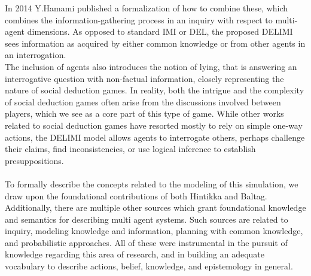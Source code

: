 In 2014 Y.Hamami\cite{delimi} published a formalization of how to combine
these, which combines the information-gathering process in an inquiry with
respect to multi-agent dimensions. As opposed to standard IMI or DEL, the
proposed DELIMI sees information as acquired by either common knowledge or from
other agents in an interrogation. \\ The inclusion of agents also introduces
the notion of lying, that is answering an interrogative question with
non-factual information, closely representing the nature of social deduction
games. In reality, both the intrigue and the complexity of social deduction
games often arise from the discussions involved between players, which we see
as a core part of this type of game. While other works related to social
deduction games have resorted mostly to rely on simple one-way actions, the
DELIMI model allows agents to interrogate others, perhaps challenge their
claims, find inconsistencies, or use logical inference to establish
presuppositions.\\ \\ To formally describe the concepts related to the modeling
of this simulation, we draw upon the foundational contributions of both
Hintikka\cite{hintikka} and Baltag\cite{Baltag}. Additionally, there are
multiple other sources which grant foundational knowledge and semantics for
describing multi agent systems. Such sources are related to
inquiry\cite{delimi}, modeling knowledge and
information\cite{modelling_multi_agent_epistemic_systems}, planning with common
knowledge\cite{multi_agent_epistemic_planner_common_knowledge}, and
probabilistic approaches\cite{probibalistic_multiagent_systems}. All of these
were instrumental in the pursuit of knowledge regarding this area of research,
and in building an adequate vocabulary to describe actions, belief, knowledge,
and epistemology in general.